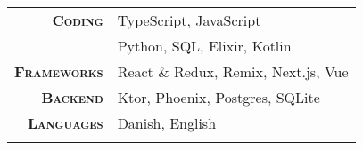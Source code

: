 \documentclass[10pt,a4paper,ragged2e,dvipsnames]{altacv}
\begin{document}


    \smallskip
    \begin{tabular}{rl}
      \makeatletter
      \textsc{\textbf{Coding}} & TypeScript, JavaScript \\
      & Python, SQL, Elixir, Kotlin \\
      \textsc{\textbf{Frameworks}} & React \& Redux, Remix, Next.js, Vue \\
      \textsc{\textbf{Backend}} & Ktor, Phoenix, Postgres, SQLite \\
      \textsc{\textbf{Languages}} & Danish, English \\
      \makeatother
    \end{tabular}







    \clearpage


    \nocite{*}







  
\end{document}
